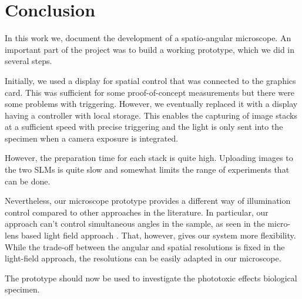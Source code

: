 \chapter{Conclusion}
In this work we, document the development of a spatio-angular
microscope. An important part of the project was to build a working
prototype, which we did in several steps.

Initially, we used a display for spatial control that was connected to
the graphics card. This was sufficient for some proof-of-concept
measurements but there were some problems with triggering. However, we
eventually replaced it with a display having a controller with local
storage. This enables the capturing of image stacks at a sufficient
speed with precise triggering and the light is only sent into the
specimen when a camera exposure is integrated.

However, the preparation time for each stack is quite high.  Uploading
images to the two SLMs is quite slow and somewhat limits the range of
experiments that can be done.

Nevertheless, our microscope prototype provides a different way of
illumination control compared to other approaches in the
literature. In particular, our approach can't control simultaneous
angles in the sample, as seen in the micro-lens based light field
approach \citep{Levoy2009}. That, however, gives our system more
flexibility. While the trade-off between the angular and spatial
resolutions is fixed in the light-field approach, the resolutions can
be easily adapted in our microscope.

The prototype should now be used to investigate the phototoxic effects
biological specimen.

